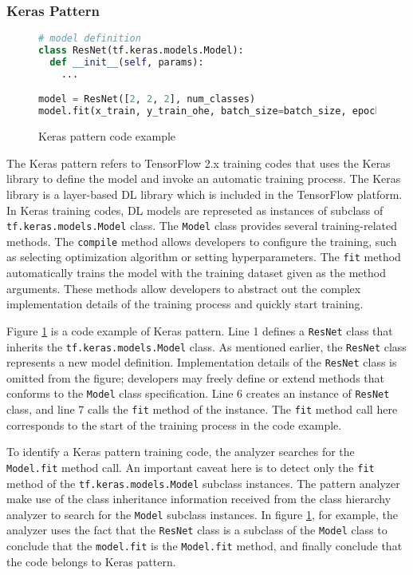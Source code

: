 \subsubsection{Keras Pattern}

\begin{figure}[ht!]
  \begin{lstlisting}[language=Python]
# model definition
class ResNet(tf.keras.models.Model):
  def __init__(self, params):
    ...

model = ResNet([2, 2, 2], num_classes)
model.fit(x_train, y_train_ohe, batch_size=batch_size, epochs=epochs,
  \end{lstlisting}
 
  \caption{Keras pattern code example}
  \label{fig:keraspattern}
\end{figure}

The Keras pattern refers to TensorFlow 2.x training codes that uses
the Keras library to define the model and invoke an automatic
training process.
The Keras library\cite{keras} is a layer-based DL library which is
included in the TensorFlow platform.
In Keras training codes, DL models are represeted as instances of
subclass of {\tt tf.keras.models.Model} class.
The {\tt Model} class provides several training-related methods.
The {\tt compile} method allows developers to configure the training,
such as selecting optimization algorithm or setting hyperparameters.
The {\tt fit} method automatically trains the model with
the training dataset given as the method arguments.
These methods allow developers to abstract out the complex implementation
details of the training process and quickly start training.

Figure \ref{fig:keraspattern} is a code example of Keras pattern.
Line 1 defines a {\tt ResNet} class that inherits the 
{\tt tf.keras.models.Model} class. As mentioned earlier, the {\tt ResNet}
class represents a new model definition.
Implementation details of the {\tt ResNet} class is omitted from the 
figure; developers may freely define or extend methods that conforms to the
{\tt Model} class specification.
Line 6 creates an instance of {\tt ResNet} class, and line 7
calls the {\tt fit} method of the instance. 
The {\tt fit} method call here corresponds to the start of the training process
in the code example.

To identify a Keras pattern training code, the analyzer searches for the
{\tt Model.fit} method call. An important caveat here is to 
detect only the {\tt fit} method of the {\tt tf.keras.models.Model} 
subclass instances. The pattern analyzer make use of the class inheritance
information received from the class hierarchy analyzer to search for
the {\tt Model} subclass instances. In figure \ref{fig:keraspattern},
for example, the analyzer uses the fact that the {\tt ResNet} class is
a subclass of the {\tt Model} class to conclude that the {\tt model.fit}
is the {\tt Model.fit} method, and finally conclude that the code
belongs to Keras pattern.



